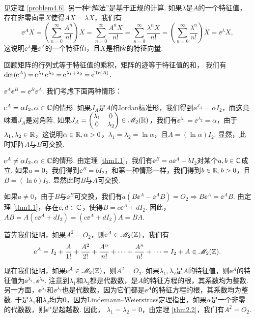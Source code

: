 \begin{solution}
  见定理 \ref{problem4.6}. 另一种“解法”是基于正规的计算. 如果$\lambda$是$A$的一个特征值，存在非零向量$X$使得$AX=\lambda X$，我们有
  \[
    \ee^AX = \left( \sum_{n=0}^\infty \frac{A^n}{n!} \right)X = \sum_{n=0}^\infty \frac{A^nX}{n!} = \sum_{n=0}^\infty \frac{\lambda^nX}{n!} = \left( \sum_{n=0}^\infty \frac{\lambda^n}{n!} \right) X = \ee^\lambda X,
  \]
  这说明$\ee^\lambda$是$\ee^A$的一个特征值，且$X$是相应的特征向量.

  回顾矩阵的行列式等于特征值的乘积，矩阵的迹等于特征值的和， 我们有$\det(\ee^A)=\ee^{\lambda_1}\ee^{\lambda_2}=\ee^{\lambda_1+\lambda_2}
  =\ee^{\Tr(A)}$.
\end{solution}

\begin{solution}
  $\ee^A\ee^B=\ee^B\ee^A$. 我们考虑下面两种情形：

  $\operatorname{\!\!\;\mathrm e}^A=\alpha I_2,\alpha\in\mathbb C$的情形. 如果$J_A$是$A$的Jordan标准形，我们得到$\ee^{J_A}=\alpha I_2$，而这意味着$J_A$是对角阵. 如果$J_A=\begin{pmatrix}
    \lambda_1 & 0 \\
    0 & \lambda_2
  \end{pmatrix}\in\mathscr M_2(\mathbb R)$，我们有$\ee^{\lambda_1}=\ee^{\lambda_2}=\alpha$，由于$\lambda_1,\lambda_2\in\mathbb R$，这说明$\alpha\in\mathbb R,\alpha>0$，$\lambda_1=\lambda_2=
  \ln\alpha$，且$A=(\ln\alpha)I_2$. 显然，此时矩阵$A$与$B$可交换.

  $\operatorname{\!\!\;\mathrm e}^A\ne\alpha I_2,\alpha\in\mathbb C$的情形. 由定理 \ref{thm1.1}，我们有$\ee^B=a\ee^A+bI_2$对某个$a,b\in\mathbb C$成立. 如果$a=0$，我们得到$\ee^B=bI_2$，和第一种情形一样，我们得到$b\in\mathbb R,b>0$，且$B=(\ln b)I_2$. 显然此时$B$与$A$可交换.

  如果$a\ne0$，由于$B$与$\ee^B$可交换，我们有$a(B\ee^A-\ee^AB)=O_2\Rightarrow B\ee^A=\ee^AB$. 由定理 \ref{thm1.1}，存在$c,d\in\mathbb C$，使得$B=c\ee^A+dI_2$. 因此，$AB=A(c\ee^A+dI_2)=(c\ee^A+dI_2)A=BA$.
\end{solution}

\begin{solution}
  首先我们证明，如果$A^2=O_2$，则$\operatorname{\!\!\;\mathrm e}^A\in\mathscr M_2(\mathbb Z)$，我们有
  \[
    \operatorname{\!\!\;\mathrm e}^A = I_2 + \frac A{1!} + \frac{A^2}{2!} + \frac{A^n}{n!} + \cdots + \frac{A^n}{n!} + \cdots = I_2 + A \in\mathscr M_2(\mathbb Z).
  \]

  现在我们证明，如果$\operatorname{\!\!\;\mathrm e}^A\in\mathscr M_2(\mathbb Z)$，则$A^2=O_2$. 如果$\lambda_1,\lambda_2$是$A$的特征值，则$\ee^A$的特征值为$\ee^{\lambda_1},\ee^{\lambda_2}$. 注意到$\lambda_1$和$\lambda_2$都是代数数，是$A$的特征方程的根，其系数均为整数. 另一方面，$\ee^{\lambda_1}$和$\ee^{\lambda_2}$也是代数数，因为它们都是$\ee^A$的特征方程的根，其系数均为整数. 于是$\lambda_1$和$\lambda_2$均为0，因为Lindemann--Weierstrass定理指出，如果$\alpha$是一个非零的代数数，则$\ee^\alpha$是超越数. 因此， $\lambda_1=\lambda_2=0$，由定理 \ref{thm2.2}，我们有$A^2=O_2$.
\end{solution}

